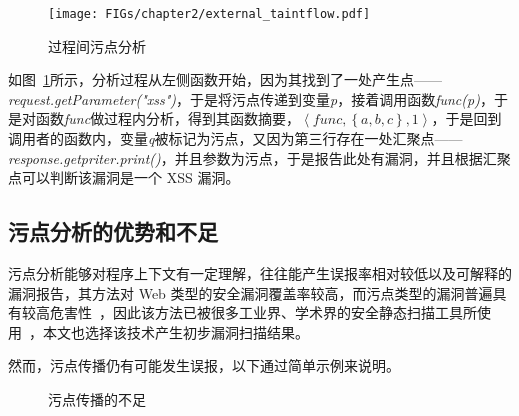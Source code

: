 \begin{figure}[!htbp]
	\centering
	\texttt{[image: FIGs/chapter2/external\_taintflow.pdf]}
	\caption{过程间污点分析}\label{externalflow}
\end{figure}

如图~\ref{externalflow}所示，分析过程从左侧函数开始，因为其找到了一处产生点——\textit{request.getParameter("xss")}，于是将污点传递到变量\textit{p}，接着调用函数\textit{func(p)}，于是对函数\textit{func}做过程内分析，得到其函数摘要，$\left\langle func, \left\{a, b, c\right\}, 1\right\rangle$，于是回到调用者的函数内，变量\textit{q}被标记为污点，又因为第三行存在一处汇聚点——\textit{response.getpriter.print()}，并且参数为污点，于是报告此处有漏洞，并且根据汇聚点可以判断该漏洞是一个 XSS 漏洞。

\subsection{污点分析的优势和不足}
污点分析能够对程序上下文有一定理解，往往能产生误报率相对较低以及可解释的漏洞报告，其方法对 Web 类型的安全漏洞覆盖率较高，而污点类型的漏洞普遍具有较高危害性~\cite{taintStyle,aletheia}，因此该方法已被很多工业界、学术界的安全静态扫描工具所使用~\cite{taintStyle,taint:taj,pixy}，本文也选择该技术产生初步漏洞扫描结果。

然而，污点传播仍有可能发生误报，以下通过简单示例来说明。

\begin{figure}[!htbp]
	\centering
	\subfigure[污点传播难以处理容器类型]{
		\label{taintcase1}
		\begin{minipage}{0.46\textwidth}
            
            \vspace{0.5em}
        \end{minipage}
    }
    \subfigure[污点传播难以分析清洁函数]{
        \label{taintcase4}
        \begin{minipage}{0.46\textwidth}
            
            \vspace{0.5em}
        \end{minipage}
    }
	\subfigure[污点传播难以分析控制流]{
		\label{taintcase2}
		\begin{minipage}{0.46\textwidth}
            
            \vspace{0.5em}
        \end{minipage}
    }
	\subfigure[污点传播难以处理特殊污染条件]{
		\label{taintcase3}
		\begin{minipage}{0.46\textwidth}
            
            \vspace{0.5em}
        \end{minipage}
    }
	\caption{污点传播的不足}
	\label{fig:rq3} %
\end{figure}

